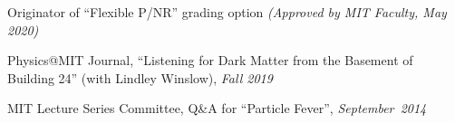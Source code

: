   





\bbl
\item Originator of ``Flexible P/NR'' grading option \textit{(Approved by MIT Faculty, May 2020)}

\item Physics@MIT Journal, ``Listening for Dark Matter from the Basement of Building 24'' (with Lindley Winslow), \textit{Fall 2019}
\item MIT Lecture Series Committee, Q\&A for ``Particle Fever'', \textit{September~2014}
\el

  